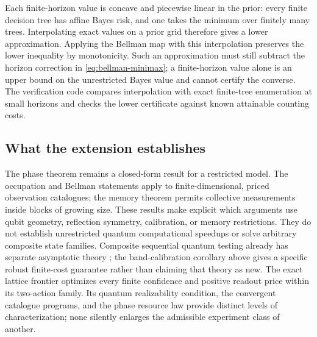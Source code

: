 Each finite-horizon value is concave and piecewise linear in the prior:
every finite decision tree has affine Bayes risk, and one takes the
minimum over finitely many trees. Interpolating exact values on a prior
grid therefore gives a lower approximation. Applying the Bellman map
with this interpolation preserves the lower inequality by monotonicity.
Such an approximation must still subtract the horizon correction in
\eqref{eq:bellman-minimax}; a finite-horizon value alone is an upper
bound on the unrestricted Bayes value and cannot certify the converse.
The verification code compares interpolation with exact finite-tree
enumeration at small horizons and checks the lower certificate against
known attainable counting costs.



\subsection{What the extension establishes}
The phase theorem remains a closed-form result for a restricted model.
The occupation and Bellman statements apply to finite-dimensional,
priced observation catalogues; the memory theorem permits collective
measurements inside blocks of growing size. These results make explicit
which arguments use qubit geometry, reflection symmetry, calibration,
or memory restrictions. They do not establish unrestricted quantum
computational speedups or solve arbitrary composite state families.
Composite sequential quantum testing already has separate asymptotic
theory \citep{simpson2026}; the band-calibration corollary above gives
a specific robust finite-cost guarantee rather than claiming that theory
as new. The exact lattice frontier optimizes every finite confidence and positive
readout price within its two-action family. Its quantum realizability
condition, the convergent catalogue programs, and the phase resource law
provide distinct levels of characterization; none silently enlarges the
admissible experiment class of another.
